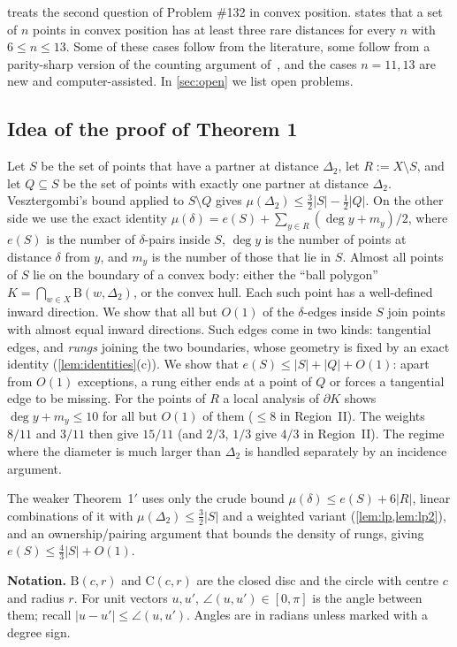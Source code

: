 \documentclass[11pt]{amsart}
\theoremstyle{definition}
\theoremstyle{remark}
\newcommand{\Dt}{\Delta_2}
\newcommand{\mult}{\mu}
\newcommand{\Cc}{\mathrm{C}}      %
\newcommand{\Dd}{\mathrm{B}}      %
\begin{document}
 treats the second question of Problem \#132 in convex position.  states that a set of $n$ points in convex position has at least three rare distances for every $n$ with $6\le n\le 13$. Some of these cases follow from the literature, some follow from a parity-sharp version of the counting argument of~\cite{CDL25}, and the cases $n=11,13$ are new and computer-assisted. In \cref{sec:open} we list open problems.

\subsection*{Idea of the proof of Theorem 1}
Let $S$ be the set of points that have a partner at distance $\Dt$, let $R:=X\setminus S$, and let $Q\subseteq S$ be the set of points with exactly one partner at distance $\Dt$. Vesztergombi's bound applied to $S\setminus Q$ gives $\mult(\Dt)\le\frac32|S|-\frac12|Q|$. On the other side we use the exact identity $\mult(\delta)=e(S)+\sum_{y\in R}(\deg y+m_y)/2$, where $e(S)$ is the number of $\delta$-pairs inside $S$, $\deg y$ is the number of points at distance $\delta$ from $y$, and $m_y$ is the number of those that lie in $S$. Almost all points of $S$ lie on the boundary of a convex body: either the ``ball polygon'' $K=\bigcap_{w\in X}\Dd(w,\Dt)$, or the convex hull. Each such point has a well-defined inward direction. We show that all but $O(1)$ of the $\delta$-edges inside $S$ join points with almost equal inward directions. Such edges come in two kinds: tangential edges, and \emph{rungs} joining the two boundaries, whose geometry is fixed by an exact identity (\cref{lem:identities}(c)). We show that $e(S)\le|S|+|Q|+O(1)$: apart from $O(1)$ exceptions, a rung either ends at a point of $Q$ or forces a tangential edge to be missing. For the points of $R$ a local analysis of $\partial K$ shows $\deg y+m_y\le10$ for all but $O(1)$ of them ($\le8$ in Region~II). The weights $8/11$ and $3/11$ then give $15/11$ (and $2/3$, $1/3$ give $4/3$ in Region~II). The regime where the diameter is much larger than $\Dt$ is handled separately by an incidence argument.

The weaker Theorem~1$'$ uses only the crude bound $\mult(\delta)\le e(S)+6|R|$, linear combinations of it with $\mult(\Dt)\le\frac32|S|$ and a weighted variant (\cref{lem:lp,lem:lp2}), and an ownership/pairing argument that bounds the density of rungs, giving $e(S)\le\frac43|S|+O(1)$.

\medskip\noindent\textbf{Notation.} $\Dd(c,r)$ and $\Cc(c,r)$ are the closed disc and the circle with centre $c$ and radius $r$. For unit vectors $u,u'$, $\angle(u,u')\in[0,\pi]$ is the angle between them; recall $|u-u'|\le\angle(u,u')$. Angles are in radians unless marked with a degree sign.
\end{document}
